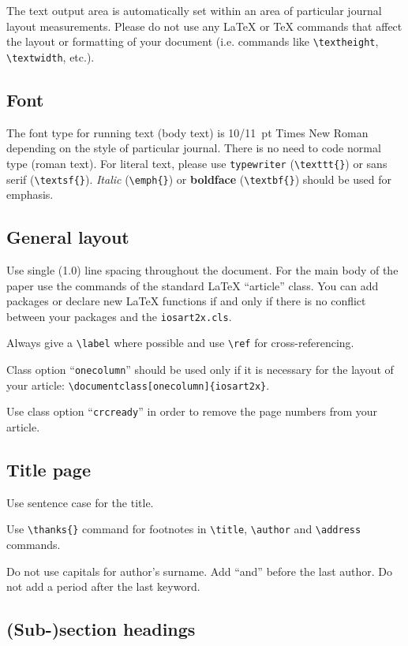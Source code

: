 \documentclass[jhs]{iosart2x}
\begin{document}
The text output area is automatically set within an area of particular journal layout measurements.
Please do not use any
\LaTeX{} or \TeX{} commands that affect the layout or formatting of
your document (i.e. commands like \verb|\textheight|,
\verb|\textwidth|, etc.).

\subsection{Font}

The font type for running text (body text) is 10/11~pt Times New Roman
depending on the style of particular journal.
There is no need to code normal type (roman text). For literal text, please use
\texttt{type\-writer} (\verb|\texttt{}|)
or \textsf{sans serif} (\verb|\textsf{}|). \emph{Italic} (\verb|\emph{}|)
or \textbf{boldface} (\verb|\textbf{}|) should be used for emphasis.


\subsection{General layout}

Use single (1.0) line spacing throughout the document. For the main
body of the paper use the commands of the standard \LaTeX{}
``article'' class. You can add packages or declare new \LaTeX{}
functions if and only if there is no conflict between your packages
and the \texttt{iosart2x.cls}.

Always give a \verb|\label| where possible and use \verb|\ref| for cross-referencing.

Class option ``\texttt{onecolumn}'' should be used only if it is
necessary for the layout of your article:\hfill\break
\verb|\documentclass[onecolumn]{iosart2x}|.

Use class option ``\texttt{crcready}'' in order to remove the page numbers from your article.


\subsection{Title page}

Use sentence case for the title.

Use \verb|\thanks{}| command for footnotes in \verb|\title|,
\verb|\author| and \verb|\address| commands.

Do not use capitals for author's surname. Add ``and'' before the last
author. Do not add a period after the last keyword.


\subsection{(Sub-)section headings}
\end{document}
